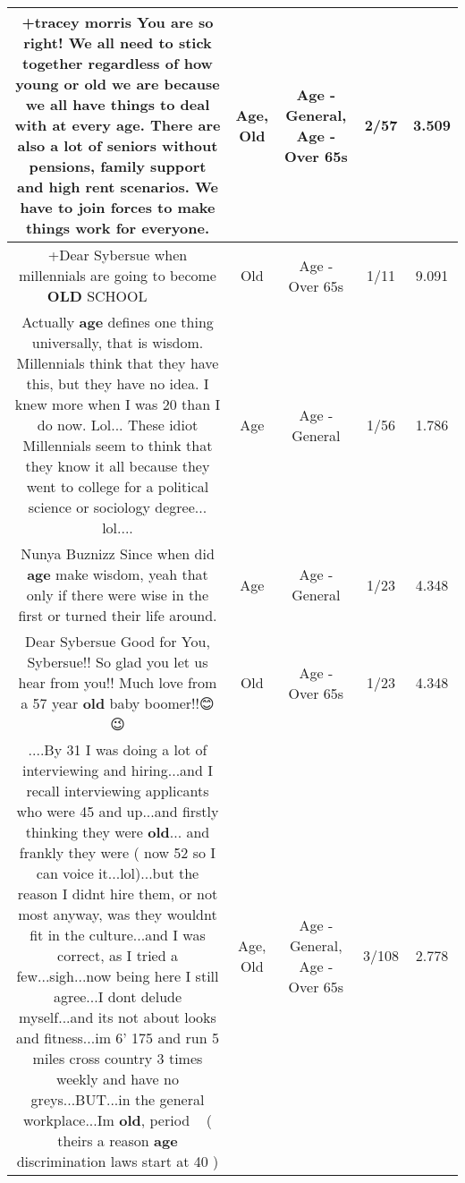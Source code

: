 \documentclass[11pt]{article}
\newlength\mylength
\begin{document}
\begin{center}
\begin{longtable}{|C{.65\mylength}|C{.30\mylength}|C{.12\mylength}|C{.12\mylength}|C{.12\mylength}|}
  \small +tracey morris You are so right! We all need to stick together regardless of how young or \textbf{old} we are because we all have things to deal with at every \textbf{age}. There are also a lot of seniors without pensions, family support and high rent scenarios. We have to join forces to make things work for everyone.\normalsize   & Age, Old & Age - General, Age - Over 65s & 2/57 & 3.509 \\  \hline
  \small +Dear Sybersue when millennials are going to become \textbf{OLD} SCHOOL 💪💪💪💪💪💪💪💪💪\normalsize   & Old & Age - Over 65s & 1/11 & 9.091 \\  \hline
  \small Actually \textbf{age} defines one thing universally, that is wisdom. Millennials think that they have this, but they have no idea. I knew more when I was 20 than I do now. Lol... These idiot Millennials seem to think that they know it all because they went to college for a political science or sociology degree... lol....\normalsize   & Age & Age - General & 1/56 & 1.786 \\  \hline
  \small Nunya Buznizz Since when did \textbf{age} make wisdom, yeah that only if there were wise in the first or turned their life around.\normalsize   & Age & Age - General & 1/23 & 4.348 \\  \hline
  \small Dear Sybersue Good for You, Sybersue!! So glad you let us hear from you!! Much love from a 57 year \textbf{old} baby boomer!!😊😉\normalsize   & Old & Age - Over 65s & 1/23 & 4.348 \\  \hline
  \small ....By 31 I was doing a lot of interviewing and hiring...and I recall interviewing applicants who were 45 and up...and firstly thinking they were \textbf{old}... and frankly they were ( now 52 so I can voice it...lol)...but the reason I didnt hire them, or not most anyway, was they wouldnt fit in the culture...and I was correct, as I tried a few...sigh...now being here I still agree...I dont delude myself...and its not about looks and fitness...im 6' 175 and run 5 miles cross country 3 times weekly and have no greys...BUT...in the general workplace...Im \textbf{old}, period ~ ( theirs a reason \textbf{age} discrimination laws start at 40 )\normalsize   & Age, Old & Age - General, Age - Over 65s & 3/108 & 2.778 \\  \hline

\end{longtable}
\end{center}
\end{document}
